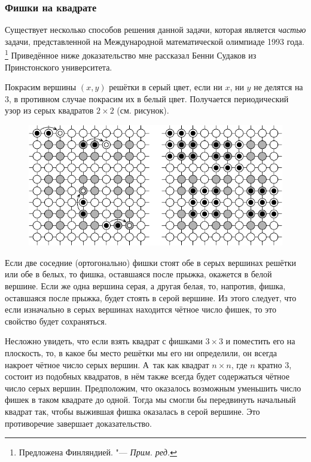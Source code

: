 \documentclass[twoside]{book}
\begin{document}
\subsubsection*{Фишки на квадрате}%

Существует несколько способов решения данной задачи, которая является \emph{частью} задачи, представленной на Международной математической олимпиаде 1993 года.%
\footnote{Предложена Финляндией. "--- \emph{Прим. ред.}}
Приведённое ниже доказательство мне рассказал Бенни Судаков из Принстонского университета.

\medskip

Покрасим вершины $(x, y)$ решётки в серый цвет, если ни $x$, ни $y$ не делятся на $3$, в противном случае покрасим их в белый цвет.
Получается периодический узор из серых квадратов $2\times 2$ (см. рисунок). 

\begin{figure}[ht!]
  \vspace{-\baselineskip}
\centering
\includegraphics{mp/wink-190}
\end{figure}


Если две соседние (ортогонально) фишки стоят обе в серых вершинах решётки или обе в белых, то фишка, оставшаяся после прыжка, окажется в белой вершине.
Если же одна вершина серая, а другая белая, то, напротив, фишка, оставшаяся после прыжка, будет стоять в серой вершине.
Из этого следует, что если изначально в серых вершинах находится чётное число фишек, то это свойство будет сохраняться.

Несложно увидеть, что если взять квадрат с фишками $3\times 3$ и поместить его на плоскость, то, в какое бы место решётки мы его ни определили, он всегда накроет чётное число серых вершин.
А~так как квадрат $n\times n$, где $n$ кратно $3$, состоит из подобных квадратов,  в нём также всегда будет содержаться чётное число серых вершин.
Предположим, что оказалось возможным уменьшить число фишек в таком квадрате до одной.
Тогда мы смогли бы передвинуть начальный квадрат так, чтобы выжившая фишка оказалась в серой вершине. 
Это противоречие завершает доказательство.
\heart
\end{document}
